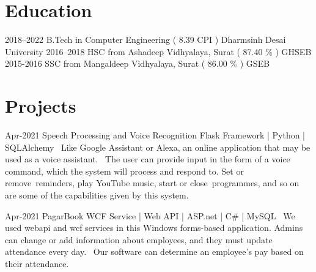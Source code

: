 \documentclass[]{cv-style}
\begin{document}
\section{Education}

\begin{entrylist}
\entry
{2018--2022}
{B.Tech {\normalfont in Computer Engineering ( 8.39 CPI )}}
{Dharmsinh Desai University}
{\vspace{-0.3cm}}
\entry
{2016--2018}
{HSC {\normalfont from Ashadeep Vidhyalaya, Surat ( 87.40 \% )}}
{GHSEB}
{\vspace{-0.3cm}}
\entry
{2015-2016}
{SSC {\normalfont from Mangaldeep Vidhyalaya, Surat ( 86.00 \% )}}
{GSEB}
{}

\end{entrylist}


\section{Projects}

\begin{entrylist}
\entry
{Apr-2021}
{Speech Processing and Voice Recognition}
{Flask Framework | Python | SQLAlchemy}
{ \textbullet\, Like Google Assistant or Alexa, an online application that may be used as a voice assistant. \newline
 \textbullet\, The user can provide input in the form of a voice command, which the system will process and respond to. Set or remove reminders, play YouTube music, start or close programmes, and so on are some of the capabilities given by this system.}
{\vspace{-0.3cm}}
\end{entrylist}

\begin{entrylist}
\entry
{Apr-2021}
{PagarBook}
{WCF Service | Web API | ASP.net | C\# | MySQL }
{ \textbullet\, We used webapi and wcf services in this Windows forms-based application. Admins can change or add information about employees, and they must update attendance every day.\newline
 \textbullet\, Our software can determine an employee's pay based on their attendance. }
{\vspace{-0.3cm}}

\end{entrylist}
\end{document}

